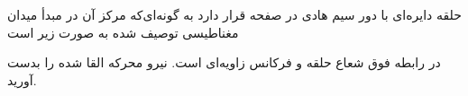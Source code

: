 
\begin{ELexample}{}

حلقه دایره‌ای با  دور سیم هادی در صفحه  قرار دارد به گونه‌ای‌که مرکز آن در مبدأ میدان مغناطیسی توصیف شده به صورت زیر است


در رابطه فوق  شعاع حلقه و \ELim{\omega} فرکانس زاویه‌ای است. نیرو محرکه القا شده را بدست آورید.

\begin{ELsolution}


\end{ELsolution}

\end{ELexample}

\ELhold


